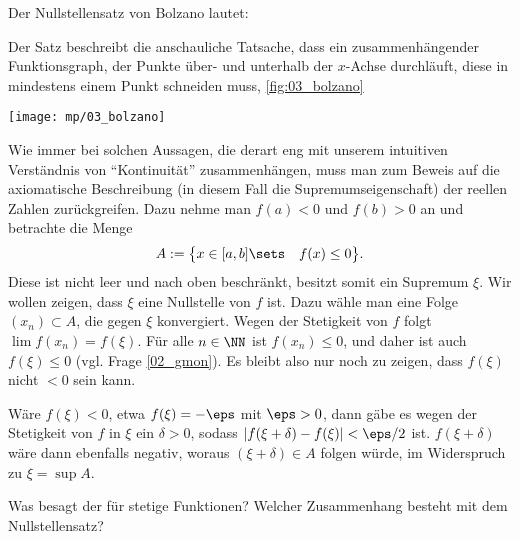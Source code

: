 \begin{antwort}
  Der Nullstellensatz von Bolzano lautet:

  \medskip\noindent 

  \medskip\noindent
  Der Satz beschreibt die anschauliche Tatsache, dass 
  ein zusammenhängender Funktionsgraph, der Punkte über- und unterhalb der 
  $x$-Achse durchläuft, diese in mindestens einem Punkt schneiden muss, \sieheAbbildung\ref{fig:03_bolzano} 

  \begin{center}
    \texttt{[image: mp/03\_bolzano]}
    \label{fig:03_bolzano}
  \end{center}
  Wie immer bei solchen Aussagen, die derart eng mit unserem intuitiven 
  Verständnis von "`Kontinuität"' zusammenhängen, muss man zum 
  Beweis auf die axiomatische Beschreibung 
  (in diesem Fall die Supremumseigenschaft)
  der reellen Zahlen zurückgreifen. 
  Dazu nehme man {\oBdA} 
  $f(a)<0$ und $f(b)>0$ an und betrachte die Menge 
  \[
  A:=\big\{ x\in[a,b]\sets \quad f(x) \le 0 \big\}.
  \]
  Diese ist nicht leer und nach oben beschränkt, 
  besitzt somit ein Supremum $\xi$. 
  Wir wollen zeigen, dass $\xi$ eine Nullstelle von $f$ ist. 
  Dazu wähle man eine Folge $(x_n)\subset A$, 
  die gegen $\xi$ konvergiert. Wegen der Stetigkeit von $f$ folgt 
  $\lim f(x_n)=f(\xi)$. 
  Für alle $n\in\NN$ ist $f(x_n)\le 0$, und daher ist auch $f(\xi)\le 0$ 
  (vgl. Frage \ref{02_gmon}). 
  Es bleibt also nur noch zu zeigen, dass $f(\xi)$ nicht $<0$ sein kann. 

  Wäre $f(\xi)<0$, etwa $f(\xi)=-\eps$ mit $\eps>0$, dann gäbe es wegen 
  der Stetigkeit von $f$ in $\xi$ ein $\delta>0$, sodass 
  $|f(\xi+\delta)-f(\xi)|<\eps/2$ ist. $f(\xi+\delta)$ wäre dann 
  ebenfalls negativ, woraus $(\xi+\delta) \in A$ folgen würde, 
  im Widerspruch zu $\xi=\sup A$.
  \AntEnd
\end{antwort}

\begin{frage}\label{03_zwi}
  Was besagt der  für stetige Funktionen? 
  Welcher Zusammenhang besteht mit dem Nullstellensatz?
\end{frage}

